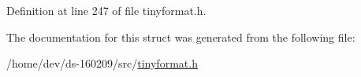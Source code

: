 Definition at line 247 of file tinyformat.\+h.



The documentation for this struct was generated from the following file\+:\begin{DoxyCompactItemize}
\item 
/home/dev/ds-\/160209/src/\hyperlink{tinyformat_8h}{tinyformat.\+h}\end{DoxyCompactItemize}
